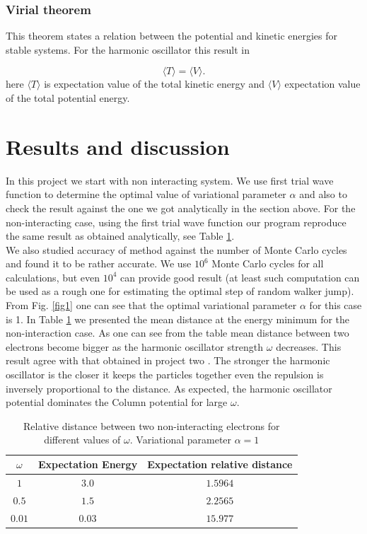 \documentclass[10pt]{article}
\begin{document}
\subsubsection{Virial theorem}
This theorem states a relation between the potential and kinetic energies for stable systems. For the harmonic oscillator this result in 

\begin{equation*}
  \langle T \rangle= \langle V \rangle.
  \end{equation*}
here $\langle T \rangle$ is expectation value of the total kinetic energy and   $\langle V \rangle$ expectation value of the total potential energy.

\newpage
\section{Results and discussion}\label{results}

In this project we start with non interacting system. We use first trial wave function to determine the optimal value of variational parameter $\alpha$ and also to check the result against the one we got analytically in the section above. For the non-interacting case, using the first trial wave function our program reproduce the same result as obtained analytically, see Table \ref{tab:one}. \\
We also studied accuracy of method against the number of Monte Carlo cycles and found it to be rather accurate. We use $10^6$ Monte Carlo cycles for all calculations, but even $10^4$ can provide good result (at least such computation can be used as a rough one for estimating the optimal step of random walker jump). 
From Fig. \ref{fig1} one can see that the optimal variational parameter $\alpha$ for this case is 1. In Table \ref{tab:one} we presented the mean distance at the energy minimum for the non-interaction case. As one can see from the table mean distance between two electrons become bigger as the harmonic oscillator strength $\omega$ decreases. This result agree with that obtained in project two \cite{proj2}. The stronger the harmonic oscillator is the closer it keeps the particles together even the repulsion is inversely proportional to the distance. As expected, the harmonic oscillator potential dominates the Column potential for large $\omega$. 

\begin{table}[h!]
  \caption{Relative distance between two non-interacting electrons for different values of $\omega$. Variational parameter $\alpha =1$}
  \label{tab:one}
  \begin{center}
    \begin{tabular}{c|c|c}
    \hline
		$\omega$& Expectation Energy & Expectation relative distance \\
    \hline
	$	1 $  &  $3.0$ & $1.5964$  \\
	$	0.5$   &$1.5$ & $2.2565$   \\
	$	0.01$   & $0.03$ &  $15.977$   \\
	\end{tabular}
  \end{center}
\end{table}
\end{document}
